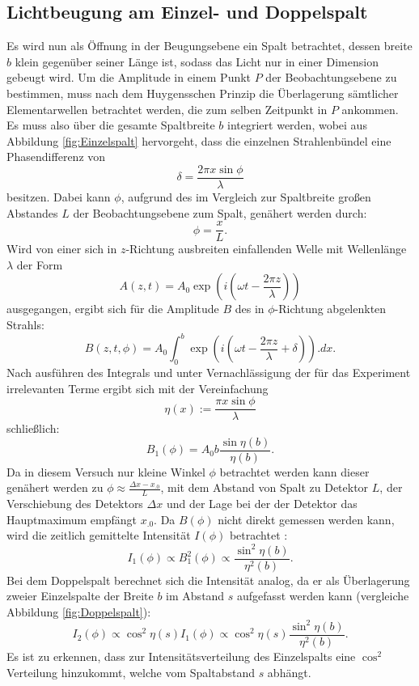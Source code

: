 \subsection{Lichtbeugung am Einzel- und Doppelspalt}

Es wird nun als Öffnung in der Beugungsebene ein Spalt betrachtet, dessen breite $b$ klein gegenüber seiner Länge ist, sodass das Licht nur in einer Dimension gebeugt wird. 
Um die Amplitude in einem Punkt $P$ der Beobachtungsebene zu bestimmen, muss nach dem Huygensschen Prinzip die Überlagerung sämtlicher Elementarwellen betrachtet werden, die zum selben Zeitpunkt in $P$ ankommen. Es muss also über die gesamte Spaltbreite $b$ integriert werden, wobei aus Abbildung \ref{fig:Einzelspalt} hervorgeht, dass die einzelnen Strahlenbündel eine Phasendifferenz von 
\[
\delta = \frac{2\pi x \sin \phi}{\lambda}
\]
besitzen. Dabei kann $\phi$, aufgrund des im Vergleich zur Spaltbreite großen Abstandes $L$ der Beobachtungsebene zum Spalt, genähert werden durch:
\begin{equation}
\phi = \frac{x}{L} \text{.}\label{eq:phi}
\end{equation} 
Wird von einer sich in $z$-Richtung ausbreiten einfallenden Welle mit Wellenlänge $\lambda$ der Form
\[
A(z,t) = A_0\exp \left(i\left(\omega t-\frac{2\pi z}{\lambda}\right)\right)
\]
ausgegangen, ergibt sich für die Amplitude $B$ des in $\phi$-Richtung abgelenkten Strahls:
\[
B(z,t,\phi) = A_0 \int_0^b\exp\left(i\left(\omega t-\frac{2\pi z}{\lambda}+\delta\right)\right).dx\text{.}
\]
Nach ausführen des Integrals und unter Vernachlässigung der für das Experiment irrelevanten Terme ergibt sich mit der Vereinfachung
\begin{equation}
\eta(x) := \frac{\pi x \sin \phi}{\lambda} \label{eq:eta}
\end{equation}
schließlich:
\[
B_1(\phi) = A_0b\frac{\sin \eta(b)}{\eta(b)}\text{.}
\]
Da in diesem Versuch nur kleine Winkel $\phi$ betrachtet werden kann dieser genähert werden zu $\phi \approx \frac{\Delta x - x_.0}{L}$, mit dem Abstand von Spalt zu Detektor $L$, der Verschiebung des Detektors $\Delta x$ und der Lage bei der der Detektor das Hauptmaximum empfängt $x_.0$.
Da $B(\phi)$ nicht direkt gemessen werden kann, wird die zeitlich gemittelte Intensität $I(\phi)$ betrachtet :
\begin{equation}
I_1(\phi)\propto B^2_1(\phi) \propto \frac{\sin^2 \eta(b)}{\eta^2(b)}\text{.} \label{eq:I1}
\end{equation}
Bei dem Doppelspalt berechnet sich die Intensität analog, da er als Überlagerung zweier Einzelspalte der Breite $b$ im Abstand $s$ aufgefasst werden kann (vergleiche Abbildung \ref{fig:Doppelspalt}):
\begin{equation}
I_2(\phi) \propto \cos^2\eta(s) I_1(\phi) \propto \cos^2\eta(s)\frac{\sin^2 \eta(b)}{\eta^2(b)}\text{.}\label{eq:I2}
\end{equation}
Es ist zu erkennen, dass zur Intensitätsverteilung des Einzelspalts eine $\cos^2$ Verteilung hinzukommt, welche vom Spaltabstand $s$ abhängt.

